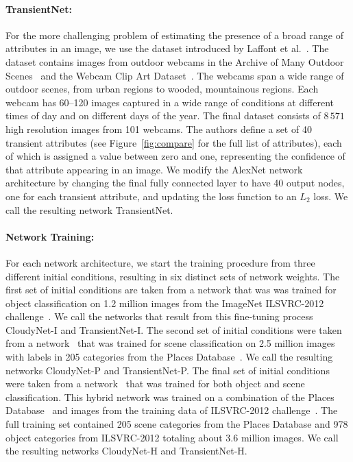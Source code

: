 \documentclass[10pt,twocolumn,letterpaper]{article}
\newcommand{\figref}[1]{Figure~\ref{fig:#1}}
\begin{document}
\vspace{-1em}
\paragraph{TransientNet:} For the more challenging problem of estimating
the presence of a broad range of attributes in an image, we use the dataset introduced by Laffont
et al.~\cite{Laffont14}. 
The dataset contains images from
outdoor webcams in the Archive of Many Outdoor Scenes~\cite{jacobs07amos} and
the Webcam Clip Art Dataset~\cite{lalondesig09}.  The webcams span a wide range
of outdoor scenes, from urban regions to wooded, mountainous regions. Each
webcam has 60--120 images captured in a wide range of conditions
at different times of day and on
different days of the year.  The final dataset consists of $8\,571$ high resolution images from 101 webcams.
The authors define a set of 40 transient attributes
(see \figref{compare} for the full list of attributes), each of which is
assigned a value between zero and one, representing the confidence
of that attribute appearing in an image. We modify the AlexNet network architecture
by changing the final fully connected layer to have 40 output nodes, one for
each transient attribute, and updating the loss function to an $L_2$
loss. We call the resulting network TransientNet. 

\vspace{-1em}
\paragraph{Network Training:} For each network architecture, we start the training procedure from three different initial conditions,
resulting in six distinct sets of network weights. The first set of initial
conditions are taken from a network that was was trained for object
classification on 1.2 million images from the ImageNet ILSVRC-2012
challenge~\cite{ILSVRCarxiv14}.  We call the networks that result from this
fine-tuning process CloudyNet-I and TransientNet-I.  The second set of initial
conditions were taken from a network~\cite{zhou2014places} that was trained for
scene classification on 2.5 million images with labels in 205 categories from
the Places Database~\cite{zhou2014places}. We call the resulting networks
CloudyNet-P and TransientNet-P.  The final set of initial conditions were taken
from a network~\cite{zhou2014places} that was trained for both object and scene
classification.  This hybrid network was trained on a combination of the Places
Database~\cite{zhou2014places} and images from the training data of ILSVRC-2012
challenge~\cite{ILSVRCarxiv14}.  The full training set contained 205 scene
categories from the Places Database and 978 object categories from ILSVRC-2012
totaling about 3.6 million images.  We call the resulting networks CloudyNet-H
and TransientNet-H.
\end{document}
